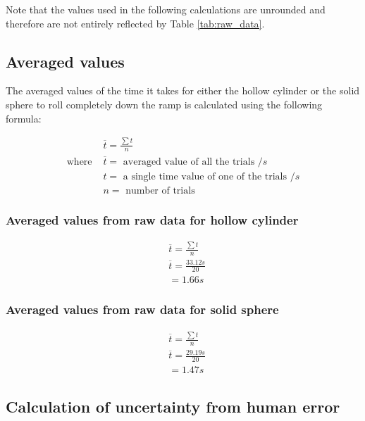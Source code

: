 \documentclass[letterpaper, 12pt]{article}
\begin{document}
Note that the values used in the following calculations are unrounded and therefore are not entirely
reflected by Table \ref*{tab:raw_data}.

\subsection{Averaged values}

The averaged values of the time it takes for either the hollow cylinder or
the solid sphere to roll completely down the ramp is calculated using the following
formula:

\begin{align*}
                  & \overline{t} = \frac{\sum t}{n}
    \\
    \text{where } & \overline{t} = \text{ averaged value of all the trials } /\unit{s}
    \\
                  & t = \text{ a single time value of one of the trials } /\unit{s}
    \\
                  & n = \text{ number of trials }
\end{align*}

\subsubsection{Averaged values from raw data for hollow cylinder}

\begin{align*}
     & \overline{t} = \frac{\sum t}{n}
    \\
     & \overline{t} = \frac{33.12 \unit{s}}{20}
    \\
     & = 1.66 \unit{s}
\end{align*}

\subsubsection{Averaged values from raw data for solid sphere}

\begin{align*}
     & \overline{t} = \frac{\sum t}{n}
    \\
     & \overline{t} = \frac{29.19\unit{s}}{20}
    \\
     & = 1.47\unit{s}
\end{align*}

\subsection{Calculation of uncertainty from human error}
\end{document}

